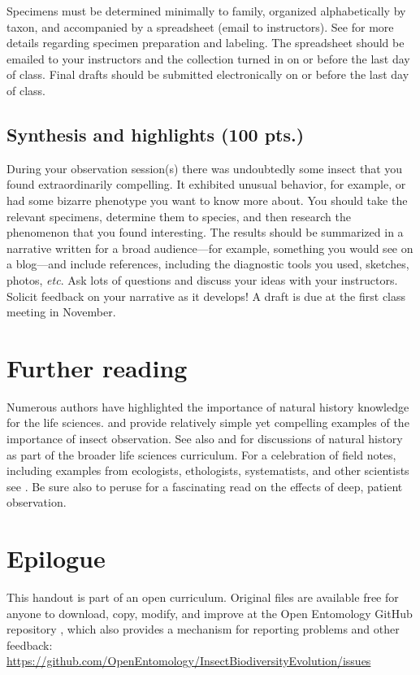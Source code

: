 \documentclass[letterpaper, 11pt]{article}
\begin{document}
\noindent{}Specimens must be determined minimally to family, organized alphabetically by taxon, and accompanied by a spreadsheet \cite{GBIFspreadsheet} (email to instructors). See \cite{FrostSOP03} for more details regarding specimen preparation and labeling. The spreadsheet should be emailed to your instructors and the collection turned in on or before the last day of class. Final drafts should be submitted electronically on or before the last day of class.

\subsection*{Synthesis and highlights (100 pts.)}
During your observation session(s) there was undoubtedly some insect that you found extraordinarily compelling. It exhibited unusual behavior, for example, or had some bizarre phenotype you want to know more about. You should take the relevant specimens, determine them to species, and then research the phenomenon that you found interesting. The results should be summarized in a narrative written for a broad audience---for example, something you would see on a blog---and include references, including the diagnostic tools you used, sketches, photos, \textit{etc}. Ask lots of questions and discuss your ideas with your instructors. Solicit feedback on your narrative as it develops! A draft is due at the first class meeting in November.

\section*{Further reading}
Numerous authors have highlighted the importance of natural history knowledge for the life sciences. \cite{agrawal2014} and \cite{wilcoveeisner2000} provide relatively simple yet compelling examples of the importance of insect observation. See also \cite{Schmidly449} and \cite{Barrows13042016} for discussions of natural history as part of the broader life sciences curriculum. For a celebration of field notes, including examples from ecologists, ethologists, systematists, and other scientists see \cite{canfield2011field}. Be sure also to peruse \cite{roberts2013} for a fascinating read on the effects of deep, patient observation.

\clearpage

\section*{Epilogue}
This handout is part of an open curriculum. Original files are available free for anyone to download, copy, modify, and improve at the Open Entomology GitHub repository \citep{ENT432}, which also provides a mechanism for reporting problems and other feedback:\\
\url{https://github.com/OpenEntomology/InsectBiodiversityEvolution/issues}



\end{document}
